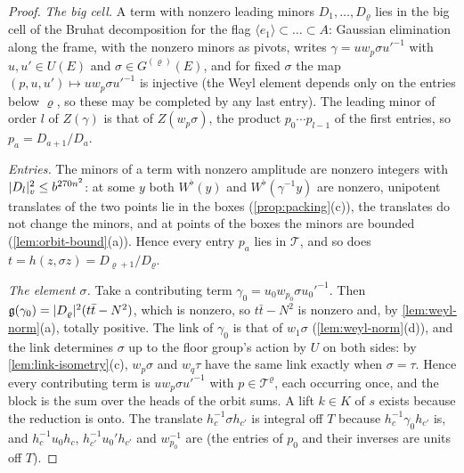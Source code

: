 \begin{proof}
\emph{The big cell.} A term with nonzero leading minors $D_1,\dots,D_\varrho$ lies in the big cell of the Bruhat decomposition for the flag $\langle e_1\rangle\subset\dots\subset A$: Gaussian elimination along the frame, with
the nonzero minors as pivots, writes $\gamma=uw_p\sigma u'^{-1}$ with $u,u'\in U(E)$ and $\sigma\in G^{(\varrho)}(E)$, and for fixed $\sigma$ the map $(p,u,u')\mapsto uw_p\sigma u'^{-1}$ is injective (the Weyl element depends only on the entries below
$\varrho$, so these may be completed by any last entry). The leading minor of order $l$ of $Z(\gamma)$ is that of $Z(w_p\sigma)$, the product $p_0\cdots p_{l-1}$ of the first entries, so $p_a=D_{a+1}/D_a$.

\emph{Entries.} The minors of a term with nonzero amplitude are nonzero integers with $\lvert D_l\rvert_v^2\le b^{270n^2}$: at some $y$ both $W^\flat(y)$ and $W^\flat(\gamma^{-1}y)$ are nonzero, unipotent translates of the two
points lie in the boxes (\cref{prop:packing}(c)), the translates do not change the minors, and at points of the boxes the minors are bounded (\cref{lem:orbit-bound}(a)). Hence every entry $p_a$ lies in $\mathcal T$, and so
does $t=h(z,\sigma z)=D_{\varrho+1}/D_\varrho$.

\emph{The element $\sigma$.} Take a contributing term $\gamma_0=u_0w_{p_0}\sigma u_0'^{-1}$. Then $\mathfrak g(\gamma_0)=\lvert D_\varrho\rvert^2(t\bar t-N^2)$, which is nonzero, so $t\bar t-N^2$ is nonzero and, by \cref{lem:weyl-norm}(a), totally
positive. The link of $\gamma_0$ is that of $w_1\sigma$ (\cref{lem:weyl-norm}(d)), and the link determines $\sigma$ up to the floor group's action by $U$ on both sides: by \cref{lem:link-isometry}(c), $w_p\sigma$ and $w_q\tau$ have the same link
exactly when $\sigma=\tau$. Hence every contributing term is $uw_p\sigma u'^{-1}$ with $p\in\mathcal T^\varrho$, each occurring once, and the block is the sum over the heads of the orbit sums. A lift $k\in K$ of $s$ exists because the
reduction is onto. The translate $h_c^{-1}\sigma h_{c'}$ is integral off $T$ because $h_c^{-1}\gamma_0h_{c'}$ is, and $h_c^{-1}u_0h_c$, $h_{c'}^{-1}u_0'h_{c'}$ and $w_{p_0}^{-1}$ are (the entries of $p_0$ and their inverses are units off $T$).
\end{proof}

